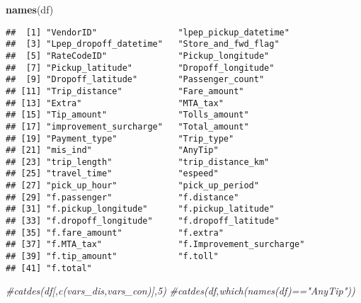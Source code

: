 \documentclass[]{article}
\newenvironment{Shaded}{\begin{snugshade}}{\end{snugshade}}
\newcommand{\KeywordTok}[1]{\textcolor[rgb]{0.13,0.29,0.53}{\textbf{{#1}}}}
\newcommand{\CommentTok}[1]{\textcolor[rgb]{0.56,0.35,0.01}{\textit{{#1}}}}
\newcommand{\NormalTok}[1]{{#1}}
\begin{document}
\begin{Shaded}
\begin{Highlighting}[]
\KeywordTok{names}\NormalTok{(df)}
\end{Highlighting}
\end{Shaded}

\begin{verbatim}
##  [1] "VendorID"                "lpep_pickup_datetime"   
##  [3] "Lpep_dropoff_datetime"   "Store_and_fwd_flag"     
##  [5] "RateCodeID"              "Pickup_longitude"       
##  [7] "Pickup_latitude"         "Dropoff_longitude"      
##  [9] "Dropoff_latitude"        "Passenger_count"        
## [11] "Trip_distance"           "Fare_amount"            
## [13] "Extra"                   "MTA_tax"                
## [15] "Tip_amount"              "Tolls_amount"           
## [17] "improvement_surcharge"   "Total_amount"           
## [19] "Payment_type"            "Trip_type"              
## [21] "mis_ind"                 "AnyTip"                 
## [23] "trip_length"             "trip_distance_km"       
## [25] "travel_time"             "espeed"                 
## [27] "pick_up_hour"            "pick_up_period"         
## [29] "f.passenger"             "f.distance"             
## [31] "f.pickup_longitude"      "f.pickup_latitude"      
## [33] "f.dropoff_longitude"     "f.dropoff_latitude"     
## [35] "f.fare_amount"           "f.extra"                
## [37] "f.MTA_tax"               "f.Improvement_surcharge"
## [39] "f.tip_amount"            "f.toll"                 
## [41] "f.total"
\end{verbatim}

\begin{Shaded}
\begin{Highlighting}[]
\CommentTok{#catdes(df[,c(vars_dis,vars_con)],5)}
\CommentTok{#catdes(df,which(names(df)=="AnyTip"))}
\end{Highlighting}
\end{Shaded}
\end{document}
